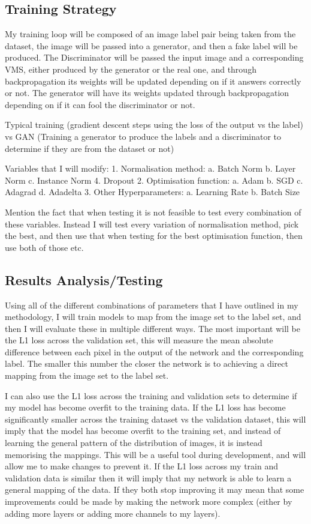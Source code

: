 \documentclass{UoYCSproject}
\begin{document}
\subsection{Training Strategy}

My training loop will be composed of an image label pair being taken from the dataset, the image will be passed into a generator, and then a fake label will be produced. The Discriminator will be passed the input image and a corresponding VMS, either produced by the generator or the real one, and through backpropagation its weights will be updated depending on if it answers correctly or not. The generator will have its weights updated through backpropagation depending on if it can fool the discriminator or not. 

Typical training (gradient descent steps using the loss of the output vs the label) vs GAN (Training a generator to produce the labels and a discriminator to determine if they are from the dataset or not)

Variables that I will modify:
1. Normalisation method:
a. Batch Norm
b. Layer Norm
c. Instance Norm
4. Dropout
2. Optimisation function:
a. Adam
b. SGD
c. Adagrad
d. Adadelta
3. Other Hyperparameters:
a. Learning Rate
b. Batch Size

Mention the fact that when testing it is not feasible to test every combination of these variables. Instead I will test every variation of normalisation method, pick the best, and then use that when testing for the best optimisation function, then use both of those etc. 

\subsection{Results Analysis/Testing}

Using all of the different combinations of parameters that I have outlined in my methodology, I will train models to map from the image set to the label set, and then I will evaluate these in multiple different ways. The most important will be the L1 loss across the validation set, this will measure the mean absolute difference between each pixel in the output of the network and the corresponding label. The smaller this number the closer the network is to achieving a direct mapping from the image set to the label set. 

I can also use the L1 loss across the training and validation sets to determine if my model has become overfit to the training data. If the L1 loss has become significantly smaller across the training dataset vs the validation dataset, this will imply that the model has become overfit to the training set, and instead of learning the general pattern of the distribution of images, it is instead memorising the mappings. This will be a useful tool during development, and will allow me to make changes to prevent it. If the L1 loss across my train and validation data is similar then it will imply that my network is able to learn a general mapping of the data. If they both stop improving it may mean that some improvements could be made by making the network more complex (either by adding more layers or adding more channels to my layers). 
\end{document}
